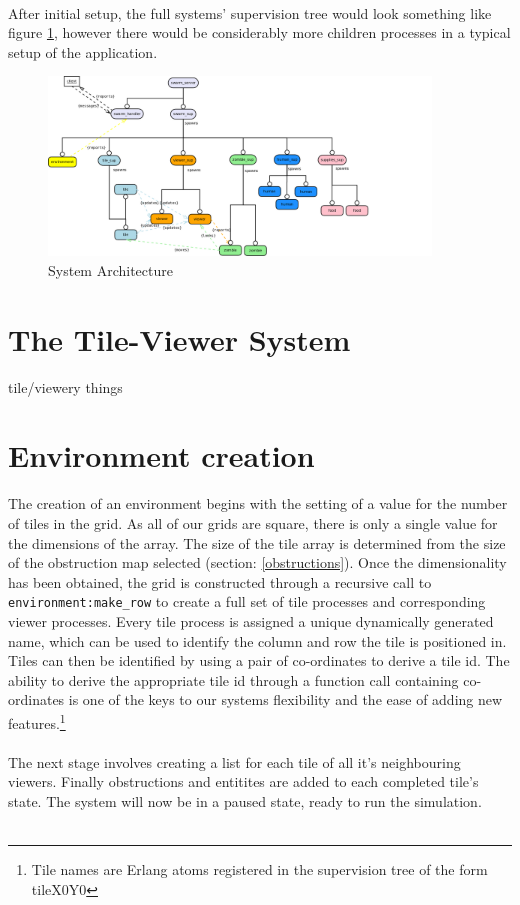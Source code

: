 \documentclass[10pt, a4paper, conference, compsocconf]{IEEEtran}
\begin{document}
\\
After initial setup, the full systems' supervision tree would look something like figure \ref{fig:system_ws}, however there would be considerably more children processes in a typical setup of the application.
\begin{figure}[h]
  \centering
  \includegraphics[width=4in]{../img/final_system_ws.png}
\caption{System Architecture}
    \label{fig:system_ws}
\end{figure}

\section{The Tile-Viewer System \label{tile_viewer}}
tile/viewery things

\section{Environment creation \label{environment_creation}}
The creation of an environment begins with the setting of a value for the number of tiles in the grid. As all of our grids are square, there is only a single value for the dimensions of the array. The size of the tile array is determined from the size of the obstruction map selected (section: \ref{obstructions}). Once the dimensionality has been obtained, the grid is constructed through a recursive call to \verb+environment:make_row+ to create a full set of tile processes and corresponding viewer processes. Every tile process is assigned a unique dynamically generated name, which can be used to identify the column and row the tile is positioned in. Tiles can then be identified by using a pair of co-ordinates to derive a tile id. The ability to derive the appropriate tile id through a function call containing co-ordinates is one of the keys to our systems flexibility and the ease of adding new features.\footnote{Tile names are Erlang atoms registered in the supervision tree of the form tileX0Y0}\\
\\
The next stage involves creating a list for each tile of all it's neighbouring viewers. Finally obstructions and entitites are added to each completed tile's state. The system will now be in a paused state, ready to run the simulation.\\
\\
\end{document}
